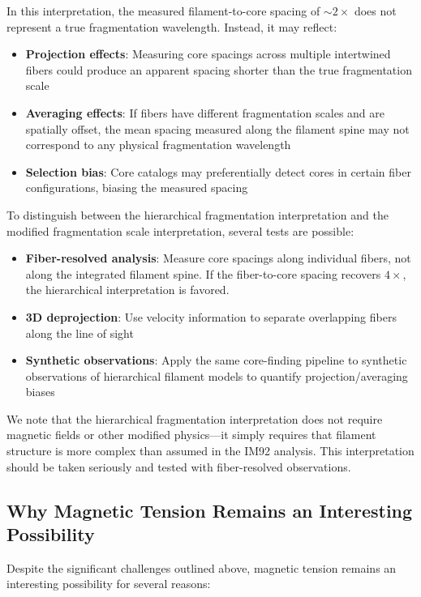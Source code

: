 \documentclass[11pt,a4paper]{article}
\begin{document}
In this interpretation, the measured filament-to-core spacing of $\sim2\times$ does not represent a true fragmentation wavelength. Instead, it may reflect:
\begin{itemize}
    \item \textbf{Projection effects}: Measuring core spacings across multiple intertwined fibers could produce an apparent spacing shorter than the true fragmentation scale
    \item \textbf{Averaging effects}: If fibers have different fragmentation scales and are spatially offset, the mean spacing measured along the filament spine may not correspond to any physical fragmentation wavelength
    \item \textbf{Selection bias}: Core catalogs may preferentially detect cores in certain fiber configurations, biasing the measured spacing
\end{itemize}

To distinguish between the hierarchical fragmentation interpretation and the modified fragmentation scale interpretation, several tests are possible:
\begin{itemize}
    \item \textbf{Fiber-resolved analysis}: Measure core spacings along individual fibers, not along the integrated filament spine. If the fiber-to-core spacing recovers $4\times$, the hierarchical interpretation is favored.
    \item \textbf{3D deprojection}: Use velocity information to separate overlapping fibers along the line of sight
    \item \textbf{Synthetic observations}: Apply the same core-finding pipeline to synthetic observations of hierarchical filament models to quantify projection/averaging biases
\end{itemize}

We note that the hierarchical fragmentation interpretation does not require magnetic fields or other modified physics—it simply requires that filament structure is more complex than assumed in the IM92 analysis. This interpretation should be taken seriously and tested with fiber-resolved observations.

\subsection{Why Magnetic Tension Remains an Interesting Possibility}

Despite the significant challenges outlined above, magnetic tension remains an interesting possibility for several reasons:
\end{document}

